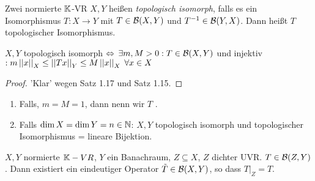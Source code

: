 \documentclass[ngerman]{report}
\begin{document}
	\begin{definition}
		Zwei normierte $\mathbb{K}$-VR $X,Y$ heißen \textit{topologisch isomorph}, falls es ein Isomorphismus 
		$T: X\to Y$ mit $T\in \BS$ und $T^{-1}\in\mathcal{B}(Y,X)$. Dann heißt $T$ topologischer Isomorphismus.
	\end{definition}

	\begin{thm}
		$X, Y$ topologisch isomorph $\overset{}{\Leftrightarrow}$ $\exists m,M > 0: T\in \BS$ und injektiv
		$: m\left\lvert \left\lvert x \right\rvert \right\rvert_X \leq \left\lvert \left\lvert Tx \right\rvert \right\rvert_Y \leq M \left\lvert \left\lvert x \right\rvert \right\rvert_X \; \forall x\in X$
	\end{thm}
	\begin{proof}
		'Klar' wegen Satz 1.17 und Satz 1.15.
	\end{proof}
	
	\begin{bem}
		\begin{enumerate}
			\item Falls, $m=M=1$, dann nenn wir $T$ .
			\item Falls $\dim X = \dim Y = n\in \mathbb{N}$: $X,Y$ topologisch isomorph und topologischer Isomorphismus = lineare Bijektion.
		\end{enumerate}
	\end{bem}
	
	\begin{thm}
		$X,Y$ normierte $\mathbb{K}-VR$, $Y$ ein Banachraum, $Z\subseteq X$, $Z$ dichter UVR.
		$T\in \mathcal{B}(Z,Y)$. Dann existiert ein eindeutiger Operator $\tilde{T} \in \BS$, so dass
		$T|_Z = T$.
	\end{thm}
\end{document}
